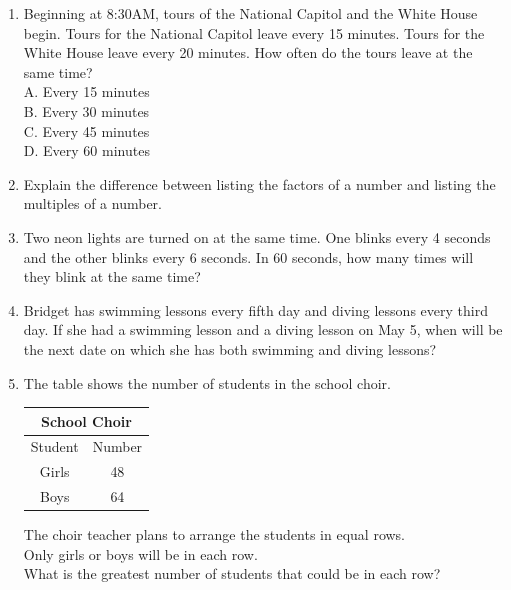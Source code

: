 \documentclass[a4paper,12pt]{article}
\begin{document}
\begin{tcolorbox}[colback=red!0!white, colframe=gray ,title=\subsection{Set Three}\label{SetThree}]
\begin{enumerate}
	\item Beginning at 8:30AM, tours of the National Capitol and the White House begin. Tours for the National Capitol leave every 15 minutes. Tours for the White House leave every 20 minutes. How often do the tours leave at the same time?\\
	A. Every 15 minutes\\
	B. Every 30 minutes\\
	C. Every 45 minutes\\
	D. Every 60 minutes
	\item Explain the difference between listing the factors of a number and listing the multiples of a number.\\
	\item Two neon lights are turned on at the same time. One blinks every 4 seconds and the other blinks every 6 seconds. In 60 seconds, how many times will they blink at the same time?\\
	\item Bridget has swimming lessons every fifth day and diving lessons every third day. If she had a swimming lesson and a diving lesson on May 5, when will be the next date on which she has both swimming and diving lessons?
	\item The table shows the number of students in the school choir.
	\begin{multicols}{2}
\begin{center}
			\begin{tabular}{|c|c|}\hline
				\multicolumn{2}{|c|}{School Choir}\\\hline
				Student&Number\\\hline
				Girls&48\\\hline
				Boys&64\\\hline
			\end{tabular}\columnbreak
\end{center}
			The choir teacher plans to arrange the students in equal rows.\\ Only girls or boys will be in each row.\\ What is the greatest number of students that could be in each row?\\

\end{multicols}
\end{enumerate}
\end{tcolorbox}
\end{document}
